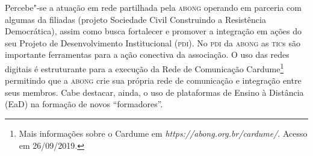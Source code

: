 Percebe"-se a atuação em rede partilhada pela \textsc{abong}
operando em parceria com algumas da filiadas (projeto Sociedade Civil
Construindo a Resistência Democrática), assim como busca fortalecer e
promover a integração em ações do seu Projeto de Desenvolvimento
Institucional (\textsc{pdi}). No \textsc{pdi} da \textsc{abong} as \textsc{tic}s são importante ferramentas
para a ação conectiva da associação. O uso das redes digitais é
estruturante para a execução da Rede de Comunicação Cardume\footnote{Mais
  informações sobre o Cardume em
  \emph{https://abong.org.br/cardume/}.
  Acesso em 26/09/2019.} permitindo que a \textsc{abong} crie sua própria rede de
comunicação e integração entre seus membros. Cabe destacar, ainda, o uso
de plataformas de Ensino à Distância (EaD) na formação de novos
``formadores''.

